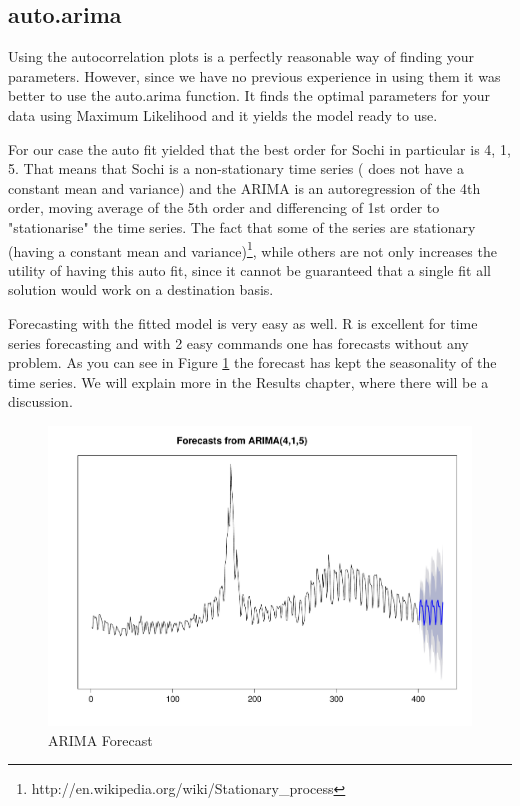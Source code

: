 \documentclass[minf,twoside,singlespacing,parskip,notimes,deptreport]{infthesis} %
\begin{document}
\subsection{auto.arima}

Using the autocorrelation plots is a perfectly reasonable way of finding your parameters. However, since we have no previous experience in using them it was better to use the auto.arima function. It finds the optimal parameters for your data using Maximum Likelihood and it yields the model ready to use. 

For our case the auto fit yielded that the best order for Sochi in particular is 4, 1, 5. That means that Sochi is a non-stationary time series ( does not have a constant mean and variance) and the ARIMA is an autoregression of the 4th order, moving average of the 5th order and differencing of 1st order to "stationarise" the time series. The fact that some of the series are stationary (having a constant mean and variance)\footnote{http://en.wikipedia.org/wiki/Stationary\_process}, while others are not only increases the utility of having this auto fit, since it cannot be guaranteed that a single fit all solution would work on a destination basis. 

Forecasting with the fitted model is very easy as well. R is excellent for time series forecasting and with 2 easy commands one has forecasts without any problem. As you can see in Figure \ref{arima-forecast} the forecast has kept the seasonality of the time series. We will explain more in the Results chapter, where there will be a discussion.

\begin{figure}[]
\begin{center}
\includegraphics[width=\textwidth]{arima_forecast}
\end{center}
\caption{ARIMA Forecast}
\label{arima-forecast}
\end{figure}
\end{document}
